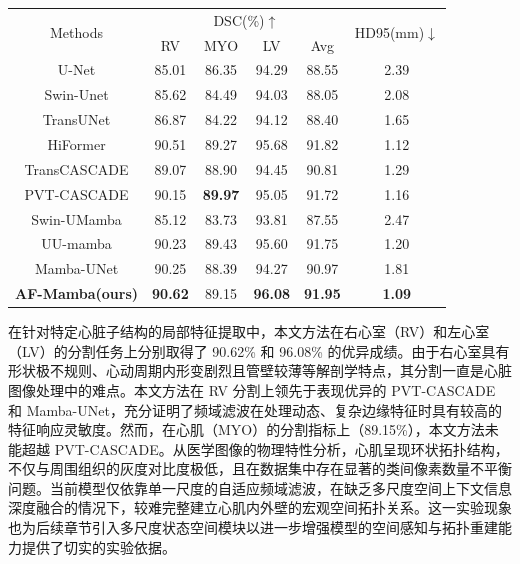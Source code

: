 \documentclass[12pt, a4paper, twoside]{article}
\begin{document}
\begin{table}[htbp]
    \centering
    \label{tab:acdc_afb_results}
    \begin{tabular}{cccccc}
        \toprule
        \multirow{2}{*}{Methods} & \multicolumn{4}{c}{DSC(\%)$\uparrow$} & \multirow{2}{*}{HD95(mm)$\downarrow$} \\
        & RV & MYO & LV & Avg & \\
        \midrule
        U-Net\cite{1} & 85.01 & 86.35 & 94.29 & 88.55 & 2.39 \\
        Swin-Unet\cite{2} & 85.62 & 84.49 & 94.03 & 88.05 & 2.08 \\
        TransUNet\cite{16} & 86.87 & 84.22 & 94.12 & 88.40 & 1.65 \\
        \hdashline
        HiFormer\cite{17} & 90.51 & 89.27 & 95.68 & 91.82 & 1.12 \\
        TransCASCADE\cite{18} & 89.07 & 88.90 & 94.45 & 90.81 & 1.29 \\
        PVT-CASCADE\cite{18} & 90.15 & \textbf{89.97} & 95.05 & 91.72 & 1.16 \\
        \hdashline
        Swin-UMamba\cite{19} & 85.12 & 83.73 & 93.81 & 87.55 & 2.47 \\
        UU-mamba\cite{20} & 90.23 & 89.43 & 95.60 & 91.75 & 1.20 \\
        Mamba-UNet\cite{14} & 90.25 & 88.39 & 94.27 & 90.97 & 1.81 \\
        \midrule
        \textbf{AF-Mamba(ours)} & \textbf{90.62} & 89.15 & \textbf{96.08} & \textbf{91.95} & \textbf{1.09} \\
        \bottomrule
    \end{tabular}
\end{table}

在针对特定心脏子结构的局部特征提取中，本文方法在右心室（RV）和左心室（LV）的分割任务上分别取得了 90.62\% 和 96.08\% 的优异成绩。由于右心室具有形状极不规则、心动周期内形变剧烈且管壁较薄等解剖学特点，其分割一直是心脏图像处理中的难点。本文方法在 RV 分割上领先于表现优异的 PVT-CASCADE 和 Mamba-UNet，充分证明了频域滤波在处理动态、复杂边缘特征时具有较高的特征响应灵敏度。然而，在心肌（MYO）的分割指标上（89.15\%），本文方法未能超越 PVT-CASCADE。从医学图像的物理特性分析，心肌呈现环状拓扑结构，不仅与周围组织的灰度对比度极低，且在数据集中存在显著的类间像素数量不平衡问题。当前模型仅依靠单一尺度的自适应频域滤波，在缺乏多尺度空间上下文信息深度融合的情况下，较难完整建立心肌内外壁的宏观空间拓扑关系。这一实验现象也为后续章节引入多尺度状态空间模块以进一步增强模型的空间感知与拓扑重建能力提供了切实的实验依据。
\end{document}
